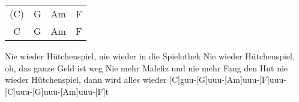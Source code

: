 \begin{guitar}
	{\footnotesize\begin{tabular}{c|c|c|c}
			(C) & G & Am & F\\
			C & G & Am & F
	\end{tabular}}

	Nie wieder Hütchenspiel, nie wieder in die Spielothek
	Nie wieder Hütchenspiel, oh, das ganze Geld ist weg
	Nie mehr Malefiz und nie mehr Fang den Hut
	nie wieder Hütchenspiel, dann wird alles wieder
	[C]guu-[G]uuu-[Am]uuu-[F]uuu-[C]uuu-[G]uuu-[Am]uuu-[F]t
	
\end{guitar}


